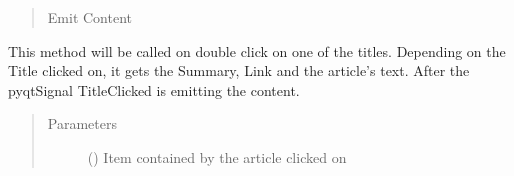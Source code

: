 \documentclass[letterpaper,10pt,english]{sphinxmanual}
\begin{document}
\begin{fulllineitems}
\begin{fulllineitems}
\begin{quote}
Emit Content
\end{quote}

This method will be called
on double click on one of
the titles.
Depending on the Title
clicked on, it gets the
Summary, Link and the
article’s text. After
the pyqtSignal TitleClicked
is emitting the content.
\begin{quote}\begin{description}
\item[{Parameters}] \leavevmode
{} () \textendash{} Item contained
by the article clicked on

\end{description}\end{quote}

\end{fulllineitems}


\end{fulllineitems}

\end{document}
